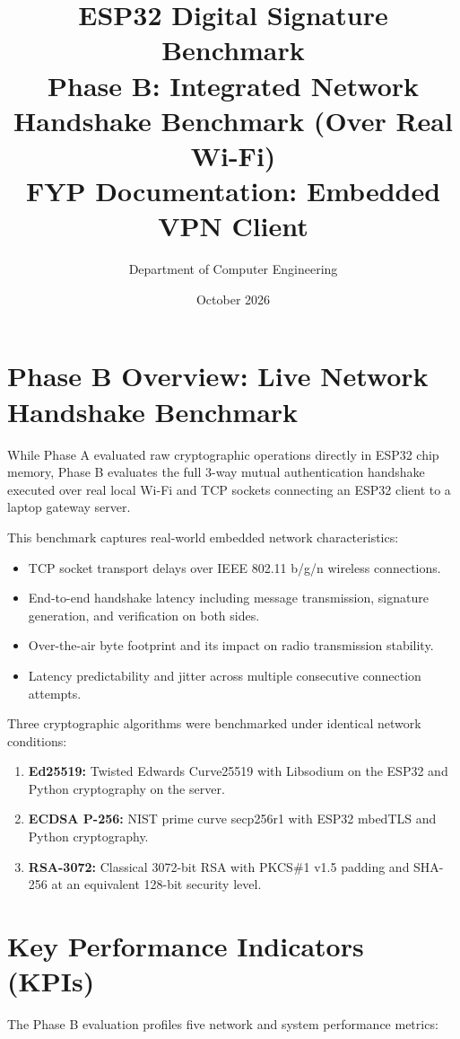 \documentclass[11pt,a4paper]{article}
\title{\textbf{ESP32 Digital Signature Benchmark}\\[0.2em]\large Phase B: Integrated Network Handshake Benchmark (Over Real Wi-Fi)\\[0.2em]\normalsize FYP Documentation: Embedded VPN Client}
\author{Department of Computer Engineering}
\date{October 2026}
\begin{document}
\maketitle

\section{Phase B Overview: Live Network Handshake Benchmark}

While Phase A evaluated raw cryptographic operations directly in ESP32 chip memory, Phase B evaluates the full 3-way mutual authentication handshake executed over real local Wi-Fi and TCP sockets connecting an ESP32 client to a laptop gateway server.

This benchmark captures real-world embedded network characteristics:
\begin{itemize}
    \item TCP socket transport delays over IEEE 802.11 b/g/n wireless connections.
    \item End-to-end handshake latency including message transmission, signature generation, and verification on both sides.
    \item Over-the-air byte footprint and its impact on radio transmission stability.
    \item Latency predictability and jitter across multiple consecutive connection attempts.
\end{itemize}

Three cryptographic algorithms were benchmarked under identical network conditions:
\begin{enumerate}
    \item \textbf{Ed25519:} Twisted Edwards Curve25519 with Libsodium on the ESP32 and Python cryptography on the server.
    \item \textbf{ECDSA P-256:} NIST prime curve secp256r1 with ESP32 mbedTLS and Python cryptography.
    \item \textbf{RSA-3072:} Classical 3072-bit RSA with PKCS\#1 v1.5 padding and SHA-256 at an equivalent 128-bit security level.
\end{enumerate}

\section{Key Performance Indicators (KPIs)}

The Phase B evaluation profiles five network and system performance metrics:
\end{document}

